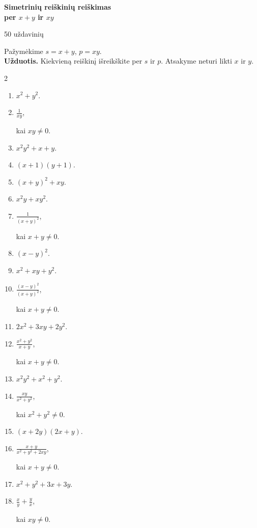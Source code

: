\documentclass[11pt,a4paper]{article}
\begin{document}
\begin{center}
{\Large\bfseries Simetrinių reiškinių reiškimas\\[3pt]per \(x+y\) ir \(xy\)}

\medskip
{\large 50 uždavinių}
\end{center}
Pažymėkime \(s=x+y\), \(p=xy\).\\
\textbf{Užduotis.} Kiekvieną reiškinį išreikškite per \(s\) ir \(p\).
Atsakyme neturi likti \(x\) ir \(y\). 
\begin{multicols}{2}
\begin{enumerate}[start=1]
\item \(\displaystyle x^2+y^2\).
\item \(\displaystyle \frac1{xy}\),\par\nopagebreak\smallskip kai \(xy\ne0\).
\item \(\displaystyle x^2y^2+x+y\).
\item \(\displaystyle (x+1)(y+1)\).
\item \(\displaystyle (x+y)^2+xy\).
\item \(\displaystyle x^2y+xy^2\).
\item \(\displaystyle \frac1{(x+y)^2}\),\par\nopagebreak\smallskip kai \(x+y\ne0\).
\item \(\displaystyle (x-y)^2\).
\item \(\displaystyle x^2+xy+y^2\).
\item \(\displaystyle \frac{(x-y)^2}{(x+y)^2}\),\par\nopagebreak\smallskip kai \(x+y\ne0\).
\item \(\displaystyle 2x^2+3xy+2y^2\).
\item \(\displaystyle \frac{x^2+y^2}{x+y}\),\par\nopagebreak\smallskip kai \(x+y\ne0\).
\item \(\displaystyle x^2y^2+x^2+y^2\).
\item \(\displaystyle \frac{xy}{x^2+y^2}\),\par\nopagebreak\smallskip kai \(x^2+y^2\ne0\).
\item \(\displaystyle (x+2y)(2x+y)\).
\item \(\displaystyle \frac{x+y}{x^2+y^2+2xy}\),\par\nopagebreak\smallskip kai \(x+y\ne0\).
\item \(\displaystyle x^2+y^2+3x+3y\).
\item \(\displaystyle \frac xy+\frac yx\),\par\nopagebreak\smallskip kai \(xy\ne0\).

\end{enumerate}
\end{multicols}
\end{document}
